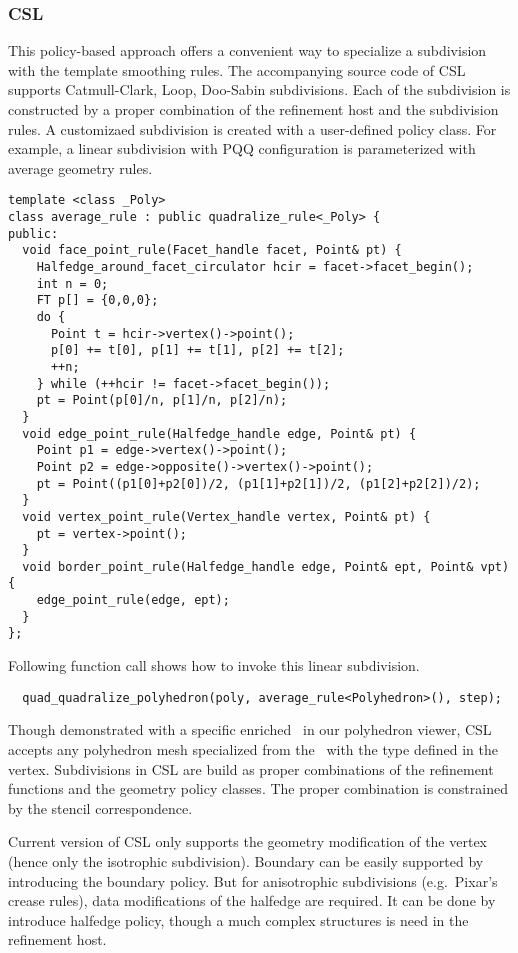 \subsubsection{CSL}
This policy-based approach offers a convenient way to
specialize a subdivision with the template smoothing rules.
The accompanying source code of CSL supports Catmull-Clark, 
Loop, Doo-Sabin subdivisions. Each of the subdivision is
constructed by a proper combination of the refinement host
and the subdivision rules. A customizaed subdivision is
created with a user-defined policy class. For example,
a linear subdivision with PQQ configuration is 
parameterized with average geometry rules.
\begin{lstlisting}
template <class _Poly>
class average_rule : public quadralize_rule<_Poly> {
public:
  void face_point_rule(Facet_handle facet, Point& pt) {
    Halfedge_around_facet_circulator hcir = facet->facet_begin();
    int n = 0;
    FT p[] = {0,0,0};
    do {
      Point t = hcir->vertex()->point();
      p[0] += t[0], p[1] += t[1], p[2] += t[2]; 
      ++n;
    } while (++hcir != facet->facet_begin());
    pt = Point(p[0]/n, p[1]/n, p[2]/n);
  }
  void edge_point_rule(Halfedge_handle edge, Point& pt) {
    Point p1 = edge->vertex()->point();
    Point p2 = edge->opposite()->vertex()->point();
    pt = Point((p1[0]+p2[0])/2, (p1[1]+p2[1])/2, (p1[2]+p2[2])/2);
  }
  void vertex_point_rule(Vertex_handle vertex, Point& pt) {
    pt = vertex->point();
  }
  void border_point_rule(Halfedge_handle edge, Point& ept, Point& vpt) {
    edge_point_rule(edge, ept);
  }
};
\end{lstlisting}
Following function call shows how to invoke this linear subdivision.
\begin{lstlisting}
  quad_quadralize_polyhedron(poly, average_rule<Polyhedron>(), step);
\end{lstlisting}

Though demonstrated with a specific enriched \poly\ in our 
polyhedron viewer, CSL accepts any polyhedron mesh specialized 
from the \poly\ with the  type defined in the vertex.  
Subdivisions in CSL are build as proper combinations of the
refinement functions and the geometry policy classes.
The proper combination is constrained by the stencil correspondence.

Current version of CSL only supports the geometry modification 
of the vertex (hence only the isotrophic subdivision). Boundary
can be easily supported by introducing the boundary policy. But
for anisotrophic subdivisions (e.g.\ Pixar's crease rules), data
modifications of the halfedge are required. It can be done by 
introduce halfedge policy, though a much complex structures
is need in the refinement host.

